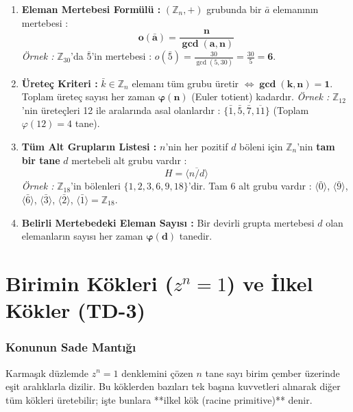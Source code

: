 \documentclass[11pt,a4paper]{article}
\begin{document}
\begin{tcolorbox}[colback=purple!5!white,colframe=purple!75!black,title=Devirli Grupların 4 Altın Formülü]
\begin{enumerate}
    \item \textbf{Eleman Mertebesi Formülü :} $(\mathbb{Z}_n, +)$ grubunda bir $\bar{a}$ elemanının mertebesi :
    \[ \mathbf{o(\bar{a}) = \frac{n}{\gcd(a, n)}} \]
    \textit{Örnek :} $\mathbb{Z}_{30}$'da $\bar{5}$'in mertebesi : $o(\bar{5}) = \frac{30}{\gcd(5, 30)} = \frac{30}{5} = \mathbf{6}$.
    
    \item \textbf{Üreteç Kriteri :} $\bar{k} \in \mathbb{Z}_n$ elemanı tüm grubu üretir $\iff \mathbf{\gcd(k, n) = 1}$.  
    Toplam üreteç sayısı her zaman $\mathbf{\varphi(n)}$ (Euler totient) kadardır.  
    \textit{Örnek :} $\mathbb{Z}_{12}$'nin üreteçleri 12 ile aralarında asal olanlardır : $\{\bar{1}, \bar{5}, \bar{7}, \overline{11}\}$ (Toplam $\varphi(12) = 4$ tane).
    
    \item \textbf{Tüm Alt Grupların Listesi :} $n$'nin her pozitif $d$ böleni için $\mathbb{Z}_n$'nin \textbf{tam bir tane} $d$ mertebeli alt grubu vardır :
    \[ H = \langle \overline{n/d} \rangle \]
    \textit{Örnek :} $\mathbb{Z}_{18}$'in bölenleri $\{1, 2, 3, 6, 9, 18\}$'dir. Tam 6 alt grubu vardır :  
    $\langle \bar{0} \rangle$, $\langle \bar{9} \rangle$, $\langle \bar{6} \rangle$, $\langle \bar{3} \rangle$, $\langle \bar{2} \rangle$, $\langle \bar{1} \rangle = \mathbb{Z}_{18}$.
    
    \item \textbf{Belirli Mertebedeki Eleman Sayısı :} Bir devirli grupta mertebesi $d$ olan elemanların sayısı her zaman $\mathbf{\varphi(d)}$ tanedir.
\end{enumerate}
\end{tcolorbox}

\vspace{0.5cm}

\section{Birimin Kökleri ($z^n = 1$) ve İlkel Kökler (TD-3)}

\subsubsection*{Konunun Sade Mantığı}
Karmaşık düzlemde $z^n = 1$ denklemini çözen $n$ tane sayı birim çember üzerinde eşit aralıklarla dizilir. Bu köklerden bazıları tek başına kuvvetleri alınarak diğer tüm kökleri üretebilir; işte bunlara **ilkel kök (racine primitive)** denir.
\end{document}
